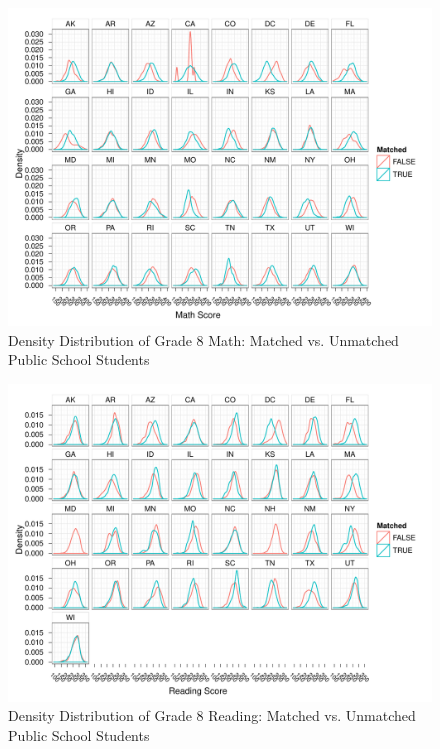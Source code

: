 \documentclass[letterpaper,12p,twoside]{article} %
\begin{document}
\begin{figure}[h]
\begin{center}
\includegraphics[height=\textwidth,angle=90]{../Figures/g8mathlrPublicDensity.pdf}
\caption{Density Distribution of Grade 8 Math: Matched vs. Unmatched Public School Students}
\label{fig:g8reading:publicdensity}
\end{center}
\end{figure}
\clearpage

\begin{figure}[h]
\begin{center}
\includegraphics[height=\textwidth,angle=90]{../Figures/g8readinglrPublicDensity.pdf}
\caption{Density Distribution of Grade 8 Reading: Matched vs. Unmatched Public School Students}
\label{fig:g8reading:publicdensity}
\end{center}
\end{figure}
\clearpage
\end{document}
